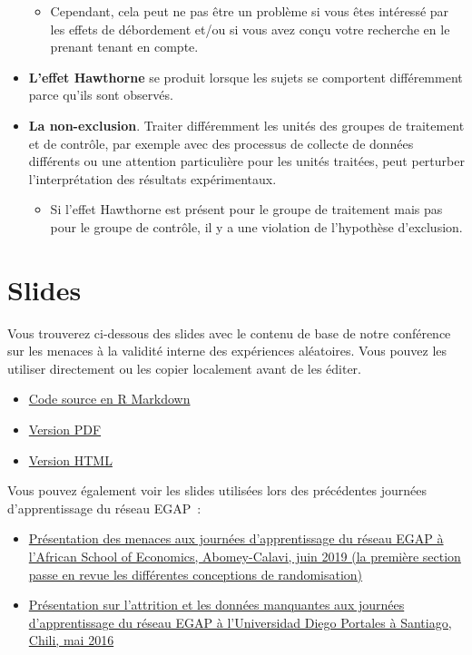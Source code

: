 \documentclass[
  12pt,
]{book}
\providecommand{\tightlist}{%
  \setlength{\itemsep}{0pt}\setlength{\parskip}{0pt}}
\begin{document}
\begin{itemize}
  \begin{itemize}
  \tightlist
  \item
    Cependant, cela peut ne pas être un problème si vous êtes intéressé par les effets de débordement et/ou si vous avez conçu votre recherche en le prenant tenant en compte.
  \end{itemize}
\item
  \textbf{L'effet Hawthorne} se produit lorsque les sujets se comportent différemment parce qu'ils sont observés.
\item
  \textbf{La non-exclusion}. Traiter différemment les unités des groupes de traitement et de contrôle, par exemple avec des processus de collecte de données différents ou une attention particulière pour les unités traitées, peut perturber l'interprétation des résultats expérimentaux.

  \begin{itemize}
  \tightlist
  \item
    Si l'effet Hawthorne est présent pour le groupe de traitement mais pas pour le groupe de contrôle, il y a une violation de l'hypothèse d'exclusion.
  \end{itemize}
\end{itemize}

\hypertarget{slides-7}{%
\section{Slides}\label{slides-7}}

Vous trouverez ci-dessous des slides avec le contenu de base de notre conférence sur les menaces à la validité interne des expériences aléatoires. Vous pouvez les utiliser directement ou les copier localement avant de les éditer.

\begin{itemize}
\item
  \href{https://egap.github.io/learningdays-resources/Slides/threats-slides.Rmd}{Code source en R Markdown}
\item
  \href{https://egap.github.io/learningdays-resources/Slides/threats-slides.pdf}{Version PDF}
\item
  \href{https://egap.github.io/learningdays-resources/Slides/threats-slides.html}{Version HTML}
\end{itemize}

Vous pouvez également voir les slides utilisées lors des précédentes journées d'apprentissage du réseau EGAP~:

\begin{itemize}
\item
  \href{https://egap.github.io/learningdays-resources/Slides/Examples/threats-benin.pdf}{Présentation des menaces aux journées d'apprentissage du réseau EGAP à l'African School of Economics, Abomey-Calavi, juin 2019 (la première section passe en revue les différentes conceptions de randomisation)}
\item
  \href{https://egap.github.io/learningdays-resources/Slides/Examples/threats-santiago.pdf}{Présentation sur l'attrition et les données manquantes aux journées d'apprentissage du réseau EGAP à l'Universidad Diego Portales à Santiago, Chili, mai 2016}
\end{itemize}
\end{document}

